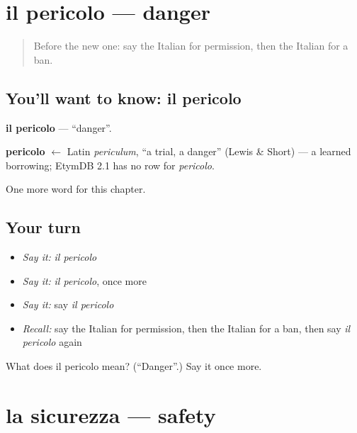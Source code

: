 \section[il pericolo]{il pericolo — danger}

\label{lesson:IT-C165-pericolo}



\begin{quote}
Before the new one: say the Italian for permission, then the Italian for a ban.
\end{quote}

\subsection*{You'll want to know: il pericolo}
\textbf{il pericolo} — \textquotedblleft{}danger\textquotedblright{}.

\begin{cousinweb}
\textbf{pericolo} $\leftarrow$ Latin \emph{periculum}, \textquotedblleft{}a trial, a danger\textquotedblright{} (Lewis \& Short) — a learned borrowing; EtymDB 2.1 has no row for \emph{pericolo}.
\end{cousinweb}

\begin{grammarlens}[title={What you've built}]
One more word for this chapter.
\end{grammarlens}

\subsection*{Your turn}
\begin{itemize}
\raggedright
  \item \emph{Say it:} \emph{il pericolo}
  \item \emph{Say it:} \emph{il pericolo}, once more
  \item \emph{Say it:} say \emph{il pericolo}
  \item \emph{Recall:} say the Italian for permission, then the Italian for a ban, then say \emph{il pericolo} again
\end{itemize}

\begin{tcolorbox}[breakable,colback=teal!4,colframe=teal!35!black,title={Before you move on}]
What does il pericolo mean? (\textquotedblleft{}Danger\textquotedblright{}.) Say it once more.
\end{tcolorbox}
\section[la sicurezza]{la sicurezza — safety}

